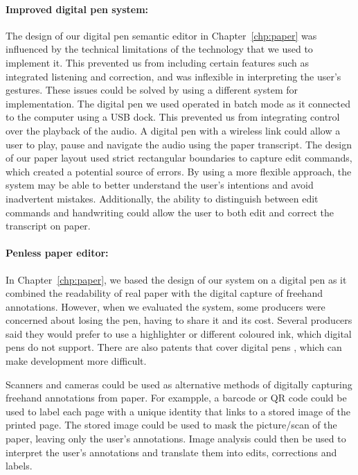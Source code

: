 \paragraph{Improved digital pen system:}

The design of our digital pen semantic editor in Chapter~\ref{chp:paper} was influenced by the technical limitations of
the technology that we used to implement it.  This prevented us from including certain features such as integrated
listening and correction, and was inflexible in interpreting the user's gestures.  These issues could be solved by
using a different system for implementation.  The digital pen we used operated in batch mode as it connected to the
computer using a USB dock. This prevented us from integrating control over the playback of the audio. A digital pen
with a wireless link could allow a user to play, pause and navigate the audio using the paper transcript.  The design
of our paper layout used strict rectangular boundaries to capture edit commands, which created a potential source of
errors. By using a more flexible approach, the system may be able to better understand the user's intentions and avoid
inadvertent mistakes.  Additionally, the ability to distinguish between edit commands and handwriting could allow the
user to both edit and correct the transcript on paper.

\paragraph{Penless paper editor:}

In Chapter~\ref{chp:paper}, we based the design of our system on a digital pen as it combined the readability of real
paper with the digital capture of freehand annotations. However, when we evaluated the system, some producers were
concerned about losing the pen, having to share it and its cost. Several producers said they would prefer to use a
highlighter or different coloured ink, which digital pens do not support. There are also patents that cover digital
pens \citep{Fahraeus2003}, which can make development more difficult.

Scanners and cameras could be used as alternative methods of digitally capturing freehand annotations from paper.  For
exampple, a barcode or QR code could be used to label each page with a unique identity that links to a stored image of
the printed page. The stored image could be used to mask the picture/scan of the paper, leaving only the user's
annotations. Image analysis could then be used to interpret the user's annotations and translate them into edits,
corrections and labels.

